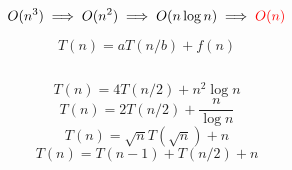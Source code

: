 
\begin{frame}{}

  \[
    O(n^3) \implies O(n^2) \implies O(n \log n) \implies \textcolor{red}{O(n)}
  \]
\end{frame}

\begin{frame}{}
  \[
    T(n) = aT(n/b) + f(n)
  \]

  \pause
  \vspace{0.50cm}
  \begin{columns}
      \begin{center}
      \end{center}
  \end{columns}

  \pause
  \vspace{0.80cm}
  \[
    T(n) = 4T(n/2) + n^2 \log n
  \]
  \[
    T(n) = 2T(n/2) + \frac{n}{\log n}
  \]
  \[
    T(n) = \sqrt{n} T(\sqrt{n}) + n
  \]
  \[
    T(n) = T(n-1) + T(n/2) + n
  \]
\end{frame}
